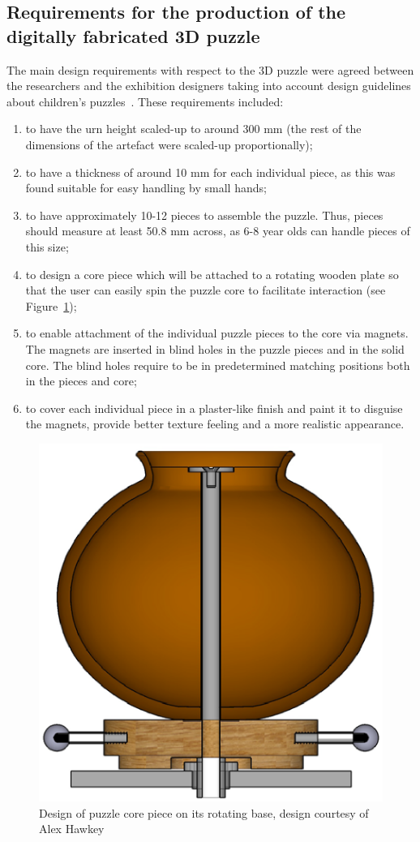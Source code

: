\documentclass[acmlarge,screen,dvipsnames]{acmart}
\begin{document}
\subsection{Requirements for the production of the digitally fabricated 3D puzzle}

The main design requirements with respect to the 3D puzzle were agreed
between the researchers and the exhibition designers taking into
account design guidelines about children's
puzzles~\cite{Smith2002}. These requirements included:
%
\begin{enumerate}
\item to have the urn height scaled-up to around 300 mm (the rest of
  the dimensions of the artefact were scaled-up proportionally);
\item to have a thickness of around 10 mm for each individual piece,
  as this was found suitable for easy handling by small hands;
\item to have approximately 10-12 pieces to assemble the puzzle. Thus,
  pieces should measure at least 50.8 mm across, as 6-8 year olds can
  handle pieces of this size;
\item to design a core piece which will be attached to a rotating
  wooden plate so that the user can easily spin the puzzle core to
  facilitate interaction (see Figure~\ref{fig:alexdesign});
\item to enable attachment of the individual puzzle pieces to the core
  via magnets. The magnets are inserted in blind holes in the puzzle
  pieces and in the solid core. The blind holes require to be in
  predetermined matching positions both in the pieces and core;
\item to cover each individual piece in a plaster-like finish and
  paint it to disguise the magnets, provide better texture feeling and
  a more realistic appearance.
\end{enumerate} 

\begin{figure}[h]
  \centering
  \includegraphics[width=0.6\linewidth]{images/alexdesign}
  \caption{\label{fig:alexdesign}%
    Design of puzzle core piece on its rotating base, design courtesy of Alex Hawkey}
\end{figure}
\end{document}
